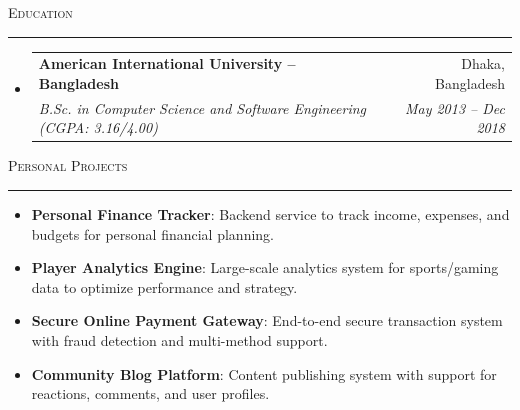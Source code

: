 \documentclass[letterpaper,11pt]{article}
\makeatletter
\newcommand{\resumesection}[1]{
  \vspace{10pt}
  {\large\scshape #1}
  \par\vspace{2pt}\hrule\vspace{5pt}
}
\newcommand{\resumeSubheading}[4]{
  \vspace{-1pt}\item
    \begin{tabular*}{0.97\textwidth}{l@{\extracolsep{\fill}}r}
      \textbf{#1} & #2 \\
      \textit{\small#3} & \textit{\small #4} \\
    \end{tabular*}\vspace{-5pt}
}
\newcommand{\resumeSubHeadingListStart}{\begin{itemize}[leftmargin=0pt, label={}]}
\newcommand{\resumeSubHeadingListEnd}{\end{itemize}}
\makeatother
\begin{document}
\resumesection{Education}
\resumeSubHeadingListStart
  \resumeSubheading
    {American International University – Bangladesh}{Dhaka, Bangladesh}
    {B.Sc. in Computer Science and Software Engineering (CGPA: 3.16/4.00)}{May 2013 – Dec 2018}
\resumeSubHeadingListEnd

\resumesection{Personal Projects}
\begin{itemize}[leftmargin=0pt, label={}]
  \item \textbf{Personal Finance Tracker}{: Backend service to track income, expenses, and budgets for personal financial planning.}
  \item \textbf{Player Analytics Engine}{: Large-scale analytics system for sports/gaming data to optimize performance and strategy.}
  \item \textbf{Secure Online Payment Gateway}{: End-to-end secure transaction system with fraud detection and multi-method support.}
  \item \textbf{Community Blog Platform}{: Content publishing system with support for reactions, comments, and user profiles.}
\end{itemize}
\end{document}
